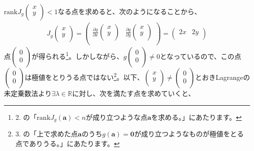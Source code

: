 \documentclass[dvipdfmx]{jsarticle}
\begin{document}
$\mathrm{rank}{J_{g}\begin{pmatrix}
x \\
y \\
\end{pmatrix}} < 1$なる点を求めると、次のようになることから、
\begin{align*}
J_{g}\begin{pmatrix}
x \\
y \\
\end{pmatrix} = \begin{pmatrix}
\frac{\partial g}{\partial x}\begin{pmatrix}
x \\
y \\
\end{pmatrix} & \frac{\partial g}{\partial y}\begin{pmatrix}
x \\
y \\
\end{pmatrix} \\
\end{pmatrix} = \begin{pmatrix}
2x & 2y \\
\end{pmatrix}
\end{align*}
点$\begin{pmatrix}
0 \\
0 \\
\end{pmatrix}$が得られる\footnote{2. の「$\mathrm{rank}{J_{g}\left( \mathbf{a} \right)} < n$が成り立つような点$\mathbf{a}$を求める。」にあたります。}。しかしながら、$g\begin{pmatrix}
0 \\
0 \\
\end{pmatrix} \neq 0$となっているので、この点$\begin{pmatrix}
0 \\
0 \\
\end{pmatrix}$は極値をとりうる点ではない\footnote{3. の「上で求めた点$\mathbf{a}$のうち$g\left( \mathbf{a} \right) = \mathbf{0}$が成り立つようなものが極値をとる点でありうる。」にあたります。}。以下、$\begin{pmatrix}
x \\
y \\
\end{pmatrix} \neq \begin{pmatrix}
0 \\
0 \\
\end{pmatrix}$とおきLagrangeの未定乗数法より$\exists\lambda \in \mathbb{R}$に対し、次を満たす点を求めていくと、
\end{document}
